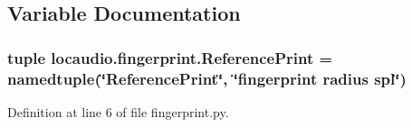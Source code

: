 \subsection{Variable Documentation}
\hypertarget{namespacelocaudio_1_1fingerprint_ad6f4abf7a6777721b881a7f0188afe92}{
\subsubsection[{Reference\-Print}]{\setlength{\rightskip}{0pt plus 5cm}tuple locaudio.\-fingerprint.\-Reference\-Print = namedtuple(\char`\"{}Reference\-Print\char`\"{}, \char`\"{}fingerprint radius spl\char`\"{})}}\label{namespacelocaudio_1_1fingerprint_ad6f4abf7a6777721b881a7f0188afe92}


Definition at line 6 of file fingerprint.\-py.

